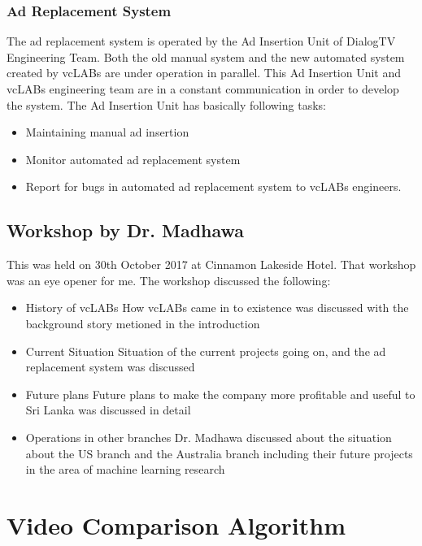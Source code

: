 \subsubsection{Ad Replacement System}

The ad replacement system is operated by the Ad Insertion Unit of DialogTV Engineering Team. Both the old manual system and the new automated system created by vcLABs are under operation in parallel. This Ad Insertion Unit and vcLABs engineering team are in a constant communication in order to develop the system. The Ad Insertion Unit has basically following tasks:

\begin{itemize}
\item Maintaining manual ad insertion
\item Monitor automated ad replacement system
\item Report for bugs in automated ad replacement system to vcLABs engineers.
\end{itemize}

\subsection{Workshop by Dr. Madhawa}

This was held on 30th October 2017 at Cinnamon Lakeside Hotel. That workshop was an eye opener for me. The workshop discussed the following:
\begin{itemize}
\item History of vcLABs
\subitem How vcLABs came in to existence was discussed with the background story metioned in the introduction
\item Current Situation
\subitem Situation of the current projects going on, and the ad replacement system was discussed
\item Future plans
\subitem Future plans to make the company more profitable and useful to Sri Lanka was discussed in detail
\item Operations in other branches
\subitem Dr. Madhawa discussed about the situation about the US branch and the Australia branch including their future projects in the area of machine learning research

\end{itemize}

\section{Video Comparison Algorithm}


